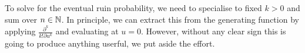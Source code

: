 To solve for the eventual ruin probability, we need to specialise to fixed $k>0$ and sum over $n\in\mathbb{N}$.
%
In principle, we can extract this from the generating function by applying $\frac{\partial^k}{k!\partial u^k}$ and evaluating at $u=0$.
%
However, without any clear sign this is going to produce anything userful, we put aside the effort.



